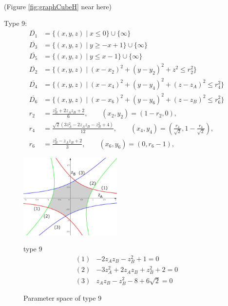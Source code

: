 \documentclass[suppldata, dvipdfmx]{interact}
\theoremstyle{plain}%
\theoremstyle{definition}
\theoremstyle{remark}
\theoremstyle{problemstyle}
\begin{document}
\noindent(Figure \ref{fig:graphCubeH} near here)
\bigskip\par
Type 9:
\begin{align*}
\overline{D_1}&=\{ (x,y,z) \mid x \le 0 \} \cup \{ \infty \}\\
\overline{D_3}&=\{(x,y,z) \mid y \ge -x + 1 \} \cup\{\infty\}\\
\overline{D_5}&=\{(x,y,z) \mid y \le x - 1 \} \cup\{\infty\}\\
\overline{D_2}&=\{(x,y,z) \mid (x-x_2)^2+(y-y_2)^2+z^2 \le r_2^2 \} \\
\overline{D_4}&=\{(x,y,z) \mid (x-x_4)^2+(y-y_4)^2+(z-z_A)^2 \le r_4^2 \} \\
\overline{D_6}&=\{(x,y,z) \mid (x-x_6)^2+(y-y_6)^2+(z-z_B)^2 \le r_6^2 \} \\
 r_2 &= \frac{z_B^2 + 2z_Az_B + 2}{6}, \qquad
(x_2, y_2) = \left(1-r_2, 0\right),\\
 r_4 &= \frac{\sqrt{2}(3z_A^2 - 2z_Az_B - z_B^2 + 4)}{12}, \qquad
(x_4, y_4) = \left(\frac{r_4}{\sqrt{2}}, 1 - \frac{r_4}{\sqrt{2}}\right),\\
 r_6 &= \frac{z_B^2 - z_Az_B + 2}{3}, \qquad
(x_6, y_6) = \left(0, r_6 - 1\right),
\end{align*} 
\begin{figure}[h]
 \begin{minipage}[]{0.5\textwidth}
 \centering
 \includegraphics[width=2in,
 keepaspectratio]{./img/graph/cubeI.jpg}
 \caption{Parameter space of type 9}
 \label{fig:graphCubeI}
 \end{minipage}
 \hspace*{\fill}
 \begin{minipage}[]{0.5\textwidth}
  \centering
  type 9
  \begin{align*}
   (1)& -2z_Az_B - z_B^2 + 1 = 0\\
   (2)& -3z_A^2 + 2 z_A z_B + z_B^2 + 2 = 0\\
   (3)& z_Az_B - z_B^2 - 8 + 6\sqrt{2} = 0
  \end{align*}
 \end{minipage}
 \hspace*{\fill}
\end{figure}
\end{document}
